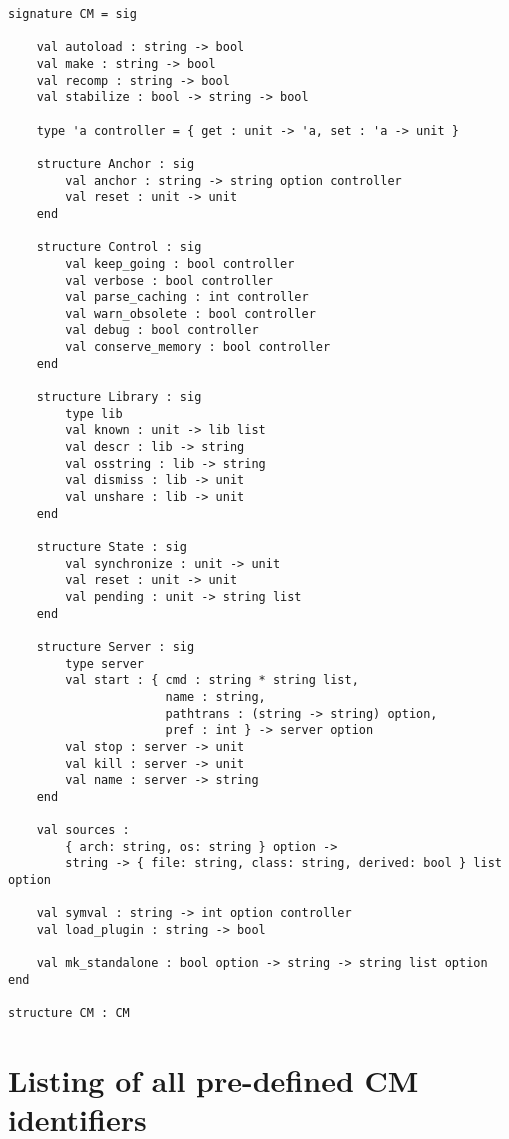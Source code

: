 \documentclass[titlepage,letterpaper]{article}
\begin{document}
\begin{verbatim}
signature CM = sig

    val autoload : string -> bool
    val make : string -> bool
    val recomp : string -> bool
    val stabilize : bool -> string -> bool

    type 'a controller = { get : unit -> 'a, set : 'a -> unit }

    structure Anchor : sig
        val anchor : string -> string option controller
        val reset : unit -> unit
    end

    structure Control : sig
        val keep_going : bool controller
        val verbose : bool controller
        val parse_caching : int controller
        val warn_obsolete : bool controller
        val debug : bool controller
        val conserve_memory : bool controller
    end

    structure Library : sig
        type lib
        val known : unit -> lib list
        val descr : lib -> string
        val osstring : lib -> string
        val dismiss : lib -> unit
        val unshare : lib -> unit
    end

    structure State : sig
        val synchronize : unit -> unit
        val reset : unit -> unit
        val pending : unit -> string list
    end

    structure Server : sig
        type server
        val start : { cmd : string * string list,
                      name : string,
                      pathtrans : (string -> string) option,
                      pref : int } -> server option
        val stop : server -> unit
        val kill : server -> unit
        val name : server -> string
    end

    val sources :
        { arch: string, os: string } option ->
        string -> { file: string, class: string, derived: bool } list option

    val symval : string -> int option controller
    val load_plugin : string -> bool

    val mk_standalone : bool option -> string -> string list option
end

structure CM : CM
\end{verbatim}

\section{Listing of all pre-defined CM identifiers}
\end{document}

